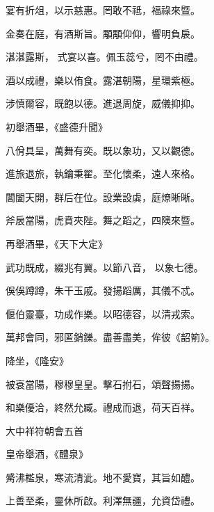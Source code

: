 \begin{pinyinscope}
 宴有折俎，以示慈惠。罔敢不祗，福祿來暨。



 金奏在庭，有酒斯旨。顒顒仰仰，響明負扆。



 湛湛露斯，
 式宴以喜。佩玉蕊兮，罔不由禮。



 酒以成禮，樂以侑食。露湛朝陽，星環紫極。



 涉慎爾容，既飽以德。進退周旋，威儀抑抑。



 初舉酒畢，《盛德升聞》



 八佾具呈，萬舞有奕。既以象功，又以觀德。



 進旅退旅，執鑰秉翟。至化懷柔，遠人來格。



 閶闔天開，群后在位。設業設虡，庭燎晰晰。



 斧扆當陽，虎賁夾陛。舞之蹈之，四隩來暨。



 再舉酒畢，《天下大定》



 武功既成，綴兆有翼。以節八音，
 以象七德。



 俁俁蹲蹲，朱干玉戚。發揚蹈厲，其儀不忒。



 偃伯靈臺，功成作樂。以昭德容，以清戎索。



 萬邦會同，邪匿銷鑠。盡善盡美，侔彼《韶箾》。



 降坐，《隆安》



 被袞當陽，穆穆皇皇。擊石拊石，頌聲揚揚。



 和樂優洽，終然允臧。禮成而退，荷天百祥。



 大中祥符朝會五首



 皇帝舉酒，《醴泉》



 觱沸檻泉，寒流清泚。地不愛寶，其旨如醴。



 上善至柔，靈休所啟。利澤無疆，允資岱禮。




\end{pinyinscope}
